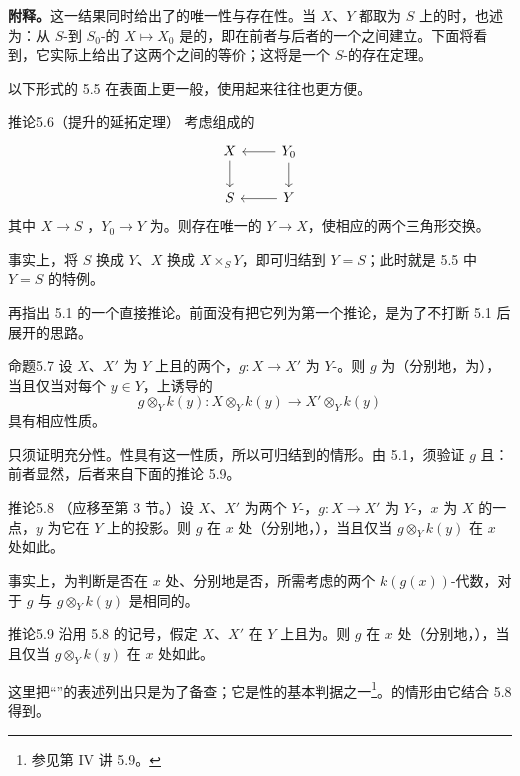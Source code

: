 \textbf{附释。}这一结果同时给出了的唯一性与存在性。当 $X$、$Y$ 都取为 $S$ 上的时，也述为：从 $S$-到 $S_0$-的 $X\mapsto X_0$ 是的，即在前者与后者的一个之间建立。下面将看到，它实际上给出了这两个之间的等价；这将是一个 $S$-的存在定理。

以下形式的 5.5 在表面上更一般，使用起来往往也更方便。
\begin{SGAresult}{推论}{5.6（提升的延拓定理）}
考虑组成的
\[
\begin{tikzcd}
 X\arrow[d] & Y_0\arrow[l]\arrow[d]\\
 S & Y\arrow[l]
\end{tikzcd}
\]
其中 $X\to S$ ，$Y_0\to Y$ 为。则存在唯一的 $Y\to X$，使相应的两个三角形交换。
\end{SGAresult}
事实上，将 $S$ 换成 $Y$、$X$ 换成 $X\times_S Y$，即可归结到 $Y=S$；此时就是 5.5 中 $Y=S$ 的特例。

再指出 5.1 的一个直接推论。前面没有把它列为第一个推论，是为了不打断 5.1 后展开的思路。
\begin{SGAresult}{命题}{5.7}
设 $X$、$X'$ 为 $Y$ 上且的两个，$g\colon X\to X'$ 为 $Y$-。则 $g$ 为（分别地，为），当且仅当对每个 $y\in Y$，上诱导的
\[
 g\otimes_Y k(y)\colon X\otimes_Y k(y)\longrightarrow X'\otimes_Y k(y)
\]
具有相应性质。
\end{SGAresult}
只须证明充分性。性具有这一性质，所以可归结到的情形。由 5.1，须验证 $g$ 且：前者显然，后者来自下面的推论 5.9。
\begin{SGAresult}{推论}{5.8}
（应移至第 3 节。）设 $X$、$X'$ 为两个 $Y$-，$g\colon X\to X'$ 为 $Y$-，$x$ 为 $X$ 的一点，$y$ 为它在 $Y$ 上的投影。则 $g$ 在 $x$ 处（分别地，），当且仅当 $g\otimes_Y k(y)$ 在 $x$ 处如此。
\end{SGAresult}
事实上，为判断是否在 $x$ 处、分别地是否，所需考虑的两个 $k(g(x))$-代数，对于 $g$ 与 $g\otimes_Y k(y)$ 是相同的。
\begin{SGAresult}{推论}{5.9}
沿用 5.8 的记号，假定 $X$、$X'$ 在 $Y$ 上且为。则 $g$ 在 $x$ 处（分别地，），当且仅当 $g\otimes_Y k(y)$ 在 $x$ 处如此。
\end{SGAresult}
这里把“”的表述列出只是为了备查；它是性的基本判据之一\footnote{参见第 IV 讲 5.9。}。的情形由它结合 5.8 得到。

